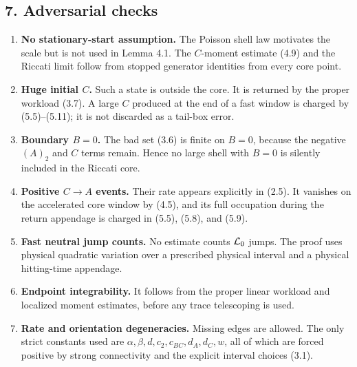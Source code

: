 \subsection{7. Adversarial checks}

\begin{enumerate}
\def\labelenumi{\arabic{enumi}.}
\item
  \textbf{No stationary-start assumption.} The Poisson shell law
  motivates the scale but is not used in Lemma 4.1. The \(C\)-moment
  estimate (4.9) and the Riccati limit follow from stopped generator
  identities from every core point.
\item
  \textbf{Huge initial \(C\).} Such a state is outside the core. It is
  returned by the proper workload (3.7). A large \(C\) produced at the
  end of a fast window is charged by (5.5)--(5.11); it is not discarded
  as a tail-box error.
\item
  \textbf{Boundary \(B=0\).} The bad set (3.6) is finite on \(B=0\),
  because the negative \((A)_2\) and \(C\) terms remain. Hence no large
  shell with \(B=0\) is silently included in the Riccati core.
\item
  \textbf{Positive \(C\to A\) events.} Their rate appears explicitly in
  (2.5). It vanishes on the accelerated core window by (4.5), and its
  full occupation during the return appendage is charged in (5.5),
  (5.8), and (5.9).
\item
  \textbf{Fast neutral jump counts.} No estimate counts \({\cal L}_0\)
  jumps. The proof uses physical quadratic variation over a prescribed
  physical interval and a physical hitting-time appendage.
\item
  \textbf{Endpoint integrability.} It follows from the proper linear
  workload and localized moment estimates, before any trace telescoping
  is used.
\item
  \textbf{Rate and orientation degeneracies.} Missing edges are allowed.
  The only strict constants used are
  \(\alpha,\beta,d,c_2,c_{BC},d_A,d_C,w\), all of which are forced
  positive by strong connectivity and the explicit interval choices
  (3.1).
\end{enumerate}
